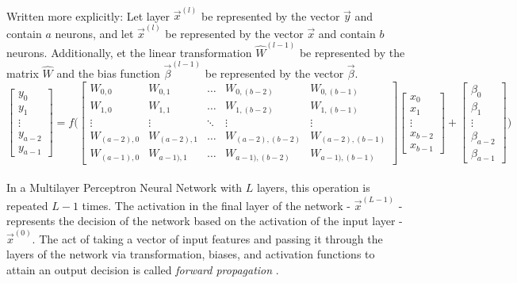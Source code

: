 \documentclass[12pt,letterpaper]{article}
\begin{document}
\paragraph*{}Written more explicitly:
Let layer $\vec{x}^{(l)}$ be represented by the vector $\vec{y}$ and contain $a$ neurons, and let $\vec{x}^{(l)}$ be represented by the vector $\vec{x}$ and contain $b$ neurons. Additionally, et the linear transformation $\hat{W}^{(l-1)}$ be represented by the matrix $\hat{W}$ and the bias function $\vec{\beta}^{(l-1)}$ be represented by the vector $\vec{\beta}$.
\begin{equation}
\label{forward-prop mat-vec}
\begin{bmatrix}
y_0 \\ y_1 \\ \vdots \\ y_{a-2} \\ y_{a-1}
\end{bmatrix} = f \Bigg(
\begin{bmatrix}
W_{0,0} & W_{0,1} & \hdots & W_{0,(b-2)} & W_{0,(b-1)} \\
W_{1,0} & W_{1,1} & \hdots & W_{1,(b-2)} & W_{1,(b-1)} \\
\vdots  & \vdots  & \ddots & \vdots      & \vdots 	   \\
W_{(a-2),0} & W_{(a-2),1} & \hdots & W_{(a-2),(b-2)} & W_{(a-2),(b-1)} \\
W_{(a-1),0} & W_{a-1),1} & \hdots & W_{a-1),(b-2)} & W_{a-1),(b-1)}
\end{bmatrix}
\begin{bmatrix}
x_0 \\ x_1 \\ \vdots \\ x_{b-2} \\ x_{b-1}
\end{bmatrix}  + 
\begin{bmatrix}
\beta_0 \\ \beta_1 \\ \vdots \\ \beta_{a-2} \\ \beta_{a-1}
\end{bmatrix}\Bigg)
\end{equation}
\paragraph*{}In a Multilayer Perceptron Neural Network  with $L$ layers, this operation is repeated $L-1$ times. The activation in the final layer of the network - $\vec{x}^{(L-1)}$ - represents the decision of the network based on the activation of the input layer - $\vec{x}^{(0)}$. The act of taking a vector of input features and passing it through the layers of the network via transformation, biases, and activation functions to attain an output decision is called \textit{forward propagation} \cite{Goodfellow}.
\end{document}
